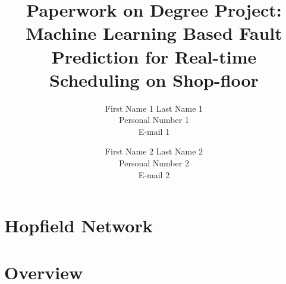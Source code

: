 \documentclass[a4paper,12pt,oneside,onecolumn]{article} %
\begin{document}

\title{Paperwork on Degree Project: Machine Learning Based Fault Prediction for Real-time Scheduling on Shop-floor}
\author{
  First Name 1 Last Name 1 \\ Personal Number 1 \\ E-mail 1 
  \and 
  First Name 2 Last Name 2 \\ Personal Number 2 \\ E-mail 2
  }

\maketitle                     %





\section*{Hopfield Network}

\section*{Overview}
\end{document}
